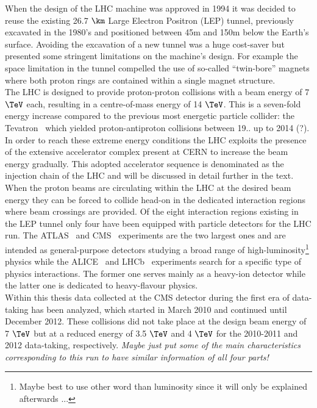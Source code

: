 When the design of the LHC machine was approved in 1994 it was decided to reuse the existing 26.7 $\km$ Large Electron Positron (LEP) tunnel, previously excavated in the 1980's and positioned between 45m and 150m below the Earth's surface.
Avoiding the excavation of a new tunnel was a huge cost-saver but presented some stringent limitations on the machine's design. For example the space limitation in the tunnel compelled the use of so-called ``twin-bore'' magnets where both proton rings are contained within a single magnet structure.
\\
The LHC is designed to provide proton-proton collisions with a beam energy of 7 $\TeV$ each, resulting in a centre-of-mass energy of 14 $\TeV$. This is a seven-fold energy increase compared to the previous most energetic particle collider: the Tevatron~\cite{} which yielded proton-antiproton collisions between 19.. up to 2014 (?). In order to reach these extreme energy conditions the LHC exploits the presence of the extensive accelerator complex present at CERN to increase the beam energy gradually. This adopted accelerator sequence is denominated as the injection chain of the LHC and will be discussed in detail further in the text.
\\
When the proton beams are circulating within the LHC at the desired beam energy they can be forced to collide head-on in the dedicated interaction regions where beam crossings are provided. Of the eight interaction regions existing in the LEP tunnel only four have been equipped with particle detectors for the LHC run. The ATLAS~\cite{} and CMS~\cite{} experiments are the two largest ones and are intended as general-purpose detectors studying a broad range of high-luminosity\footnote{Maybe best to use other word than luminosity since it will only be explained afterwards ...} physics while the ALICE~\cite{} and LHCb~\cite{} experiments search for a specific type of physics interactions. The former one serves mainly as a heavy-ion detector while the latter one is dedicated to heavy-flavour physics.
\\
Within this thesis data collected at the CMS detector during the first era of data-taking has been analyzed, which started in March 2010 and continued until December 2012. These collisions did not take place at the design beam energy of 7 $\TeV$ but at a reduced energy of 3.5 $\TeV$ and 4 $\TeV$ for the 2010-2011 and 2012 data-taking, respectively. \textit{Maybe just put some of the main characteristics corresponding to this run to have similar information of all four parts!}

